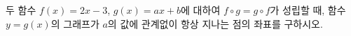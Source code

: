 두 함수 $f(x)=2x-3$, $g(x)=ax+b$에 대하여 $f\circ g=g\circ f$가 성립할 때, 함수 $y=g(x)$의 그래프가 $a$의 값에 관계없이 항상 지나는 점의 좌표를 구하시오. 
